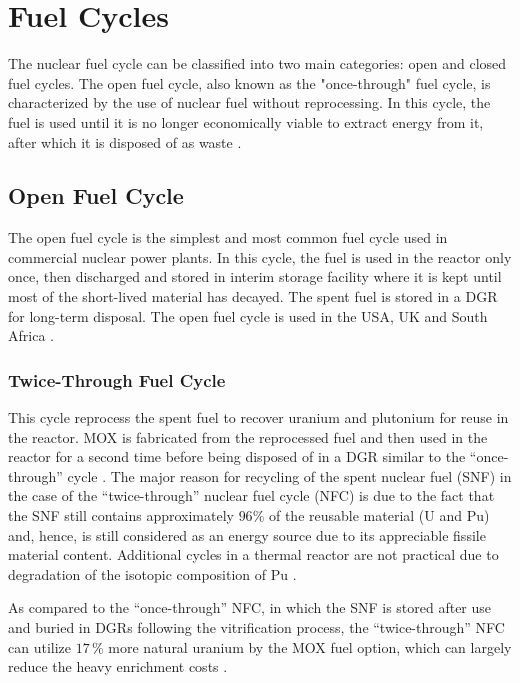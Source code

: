 \section{Fuel Cycles}

The nuclear fuel cycle can be classified into two main categories: open and closed fuel cycles. The open fuel cycle, also known as the "once-through" fuel cycle, is characterized by the use of nuclear fuel without reprocessing. In this cycle, the fuel is used until it is no longer economically viable to extract energy from it, after which it is disposed of as waste \cite{fuel_cycle_book}.

\subsection{Open Fuel Cycle}

The open fuel cycle is the simplest and most common fuel cycle used in commercial nuclear power plants. In this cycle, the fuel is used in the reactor only once, then discharged and stored in interim storage facility where it is kept until most of the short-lived material has decayed. The spent fuel is stored in a DGR for long-term disposal. The open fuel cycle is used in the USA, UK and South Africa \cite{fuel_cycle_book}.

\subsubsection{Twice-Through Fuel Cycle}

This cycle reprocess the spent fuel to recover uranium and plutonium for reuse in the reactor. MOX is fabricated from the reprocessed fuel and then used in the reactor for a second time before being disposed of in a DGR similar to the ``once-through'' cycle \cite{fuel_cycle_book}. The major reason for recycling of the spent nuclear fuel (SNF) in the case of the “twice-through” nuclear fuel cycle (NFC) is due to the fact that the SNF still contains approximately \(96\%\) of the reusable material (U and Pu) and, hence, is still considered as an energy source due to its appreciable fissile material content. Additional cycles in a thermal reactor are not practical due to degradation of the isotopic composition of Pu \cite{fuel_cycle_book}.

As compared to the “once-through” NFC, in which the SNF is stored after use and buried in DGRs following the vitrification process, the “twice-through” NFC can utilize \(17 \, \%\) more natural uranium by the MOX fuel option, which can largely reduce the heavy enrichment costs \cite{fuel_cycle_book}. 

